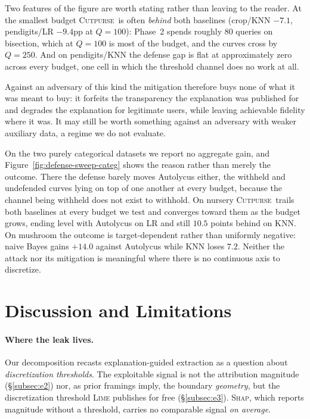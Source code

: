 \documentclass[sigconf,anonymous,review]{acmart}
\newcommand{\sys}{\textsc{Cutpurse}}
\begin{document}
Two features of the figure are worth stating rather than leaving to the reader. At the smallest
budget \sys\ is often \emph{behind} both baselines (crop/KNN $-7.1$, pendigits/LR $-9.4$pp at
$Q{=}100$): Phase~2 spends roughly $80$ queries on bisection, which at $Q{=}100$ is most of the
budget, and the curves cross by $Q{=}250$. And on pendigits/KNN the defense gap is flat at
approximately zero across every budget, one cell in which the threshold channel does no work at all.

Against an adversary of this kind the mitigation therefore buys none of what it was meant to buy: it
forfeits the transparency the explanation was published for and degrades the explanation for
legitimate users, while leaving achievable fidelity where it was. It may still be worth something
against an adversary with weaker auxiliary data, a regime we do not evaluate.

On the two purely categorical datasets we report no aggregate gain, and
Figure~\ref{fig:defense-sweep-categ} shows the reason rather than merely the outcome. There the
defense barely moves Autolycus either, the withheld and undefended curves lying on top of one another
at every budget, because the channel being withheld does not exist to withhold. On nursery \sys\
trails both baselines at every budget we test and converges toward them as the budget grows, ending
level with Autolycus on LR and still $10.5$ points behind on KNN. On mushroom the outcome is
target-dependent rather than uniformly negative: naive Bayes gains $+14.0$ against Autolycus while
KNN loses $7.2$. Neither the attack nor its mitigation is meaningful where there is no continuous
axis to discretize.

\section{Discussion and Limitations}
\label{sec:discussion}
\paragraph{Where the leak lives.} Our decomposition recasts explanation-guided extraction as a
question about \emph{discretization thresholds}. The exploitable signal is not the attribution magnitude
(\S\ref{subsec:e2}) nor, as prior framings imply, the boundary \emph{geometry}, but the discretization
threshold \textsc{Lime} publishes for free (\S\ref{subsec:e3}). \textsc{Shap}, which reports magnitude
without a threshold, carries no comparable signal \emph{on average}.
\end{document}
